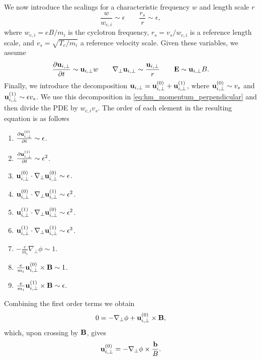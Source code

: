\documentclass[oneside,a4paper,11pt]{report}
\begin{document}
We now introduce the scalings for a characteristic frequency $w$ and length scale $r$
\begin{equation}
    \frac{w}{w_{c,i}} \sim \epsilon \qquad \frac{r_s}{r} \sim \epsilon,
\end{equation}
where $w_{c,i} = eB/m_i$ is the cyclotron frequency, $r_s = v_s/w_{c,i}$ is a reference length scale, and $v_s = \sqrt{T_e/m_i}$ a reference velocity scale. Given these variables, we assume
\begin{equation}
    \frac{\partial \mathbf{u}_{i,\perp}}{\partial t} \sim \mathbf{u}_{i,\perp} w \qquad \nabla_\perp \mathbf{u}_{i,\perp} \sim \frac{\mathbf{u}_{i,\perp}}{r} \qquad \mathbf{E} \sim \mathbf{u}_{i,\perp} B.
\end{equation}
Finally, we introduce the decomposition $\mathbf{u}_{i,\perp} = \mathbf{u}_{i,\perp}^{(0)} + \mathbf{u}_{i,\perp}^{(1)}$, where $\mathbf{u}_{i,\perp}^{(0)} \sim v_s$ and $\mathbf{u}_{i,\perp}^{(1)} \sim \epsilon v_s$. We use this decomposition in \cref{eq:hm_momentum_perpendicular} and then divide the PDE by $w_{c,i} v_s$. The order of each element in the resulting equation is as follows
\begin{enumerate}
    \item $\frac{\partial \mathbf{u}_{i,\perp}^{(0)}}{\partial t} \sim \epsilon$.
    \item $\frac{\partial \mathbf{u}_{i,\perp}^{(1)}}{\partial t} \sim \epsilon^2$.
    \item $\mathbf{u}_{i,\perp}^{(0)} \cdot \nabla_\perp \mathbf{u}_{i,\perp}^{(0)} \sim \epsilon$.
    \item $\mathbf{u}_{i,\perp}^{(0)} \cdot \nabla_\perp \mathbf{u}_{i,\perp}^{(1)} \sim \epsilon^2$.
    \item $\mathbf{u}_{i,\perp}^{(1)} \cdot \nabla_\perp \mathbf{u}_{i,\perp}^{(0)} \sim \epsilon^2$.
    \item $\mathbf{u}_{i,\perp}^{(1)} \cdot \nabla_\perp \mathbf{u}_{i,\perp}^{(1)} \sim \epsilon^3$.
    \item $-\frac{e}{m_i} \nabla_\perp \phi \sim 1$.
    \item $\frac{e}{m_i} \mathbf{u}_{i,\perp}^{(0)} \times \mathbf{B} \sim 1$.
    \item $\frac{e}{m_i} \mathbf{u}_{i,\perp}^{(1)} \times \mathbf{B} \sim \epsilon$.
\end{enumerate}
Combining the first order terms we obtain
\begin{equation}
    0 = - \nabla_\perp \phi + \mathbf{u}_{i,\perp}^{(0)} \times \mathbf{B},
\end{equation}
which, upon crossing by $\mathbf{B}$, gives
\begin{equation}
\label{eq:hm_e_cross_b_drift}
    \mathbf{u}_{i,\perp}^{(0)} = -\nabla_\perp \phi \times \frac{\mathbf{b}}{B}.
\end{equation}
\end{document}
